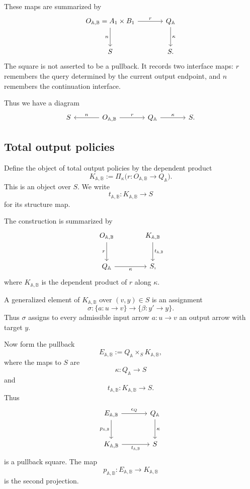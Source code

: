 These maps are summarized by
\[
\begin{tikzcd}[column sep=large,row sep=large]
O_{\mathbb A,\mathbb B}=A_1\times B_1
  \arrow[r, "r"]
  \arrow[d, "n"']
&
Q_{\mathbb A}
  \arrow[d, "\kappa"]
\\
S
&
S .
\end{tikzcd}
\]
The square is not asserted to be a pullback. It records two interface
maps: \(r\) remembers the query determined by the current output endpoint,
and \(n\) remembers the continuation interface.

Thus we have a diagram
\[
\begin{tikzcd}[column sep=large]
S
&
O_{\mathbb A,\mathbb B}
  \arrow[l, "n"']
  \arrow[r, "r"]
&
Q_{\mathbb A}
  \arrow[r, "\kappa"]
&
S .
\end{tikzcd}
\]

\subsection{Total output policies}

Define the object of total output policies by the dependent product
\[
K_{\mathbb A,\mathbb B}
:=
\Pi_\kappa
\bigl(r:O_{\mathbb A,\mathbb B}\to Q_{\mathbb A}\bigr).
\]
This is an object over \(S\). We write
\[
t_{\mathbb A,\mathbb B}:K_{\mathbb A,\mathbb B}\to S
\]
for its structure map.

The construction is summarized by
\[
\begin{tikzcd}[column sep=large,row sep=large]
O_{\mathbb A,\mathbb B}
  \arrow[d, "r"']
&
K_{\mathbb A,\mathbb B}
  \arrow[d, "t_{\mathbb A,\mathbb B}"]
\\
Q_{\mathbb A}
  \arrow[r, "\kappa"']
&
S ,
\end{tikzcd}
\]
where \(K_{\mathbb A,\mathbb B}\) is the dependent product of \(r\) along
\(\kappa\).

A generalized element of \(K_{\mathbb A,\mathbb B}\) over
\((v,y)\in S\) is an assignment
\[
\sigma:
\{a:u\to v\}
\longrightarrow
\{\beta:y'\to y\}.
\]
Thus \(\sigma\) assigns to every admissible input arrow \(a:u\to v\) an
output arrow with target \(y\).

Now form the pullback
\[
E_{\mathbb A,\mathbb B}
:=
Q_{\mathbb A}\times_{S}K_{\mathbb A,\mathbb B},
\]
where the maps to \(S\) are
\[
\kappa:Q_{\mathbb A}\to S
\]
and
\[
t_{\mathbb A,\mathbb B}:K_{\mathbb A,\mathbb B}\to S.
\]
Thus
\[
\begin{tikzcd}[column sep=large,row sep=large]
E_{\mathbb A,\mathbb B}
  \arrow[r, "\epsilon_Q"]
  \arrow[d, "p_{\mathbb A,\mathbb B}"']
&
Q_{\mathbb A}
  \arrow[d, "\kappa"]
\\
K_{\mathbb A,\mathbb B}
  \arrow[r, "t_{\mathbb A,\mathbb B}"']
&
S
\end{tikzcd}
\]
is a pullback square. The map
\[
p_{\mathbb A,\mathbb B}:E_{\mathbb A,\mathbb B}\to K_{\mathbb A,\mathbb B}
\]
is the second projection.

